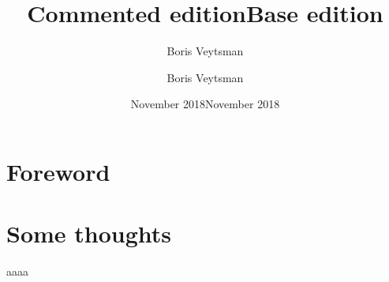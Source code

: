 \documentclass{book}
\title{Commented edition}
\author{Boris Veytsman}
\date{November 2018}
\begin{document}
\frontmatter
\title{Base edition}
\author{Boris Veytsman}
\date{November 2018}
\maketitle

\chapter{Foreword}
\label{chap:foreword}


\kant[1-5]

\begin{commeditText}
  \kant[11-17]
\end{commeditText}

\mainmatter

\chapter{Some thoughts}
\label{chap:thoughts}



\begin{commeditComments}
  \kant[6]
\end{commeditComments}

\kant[6]


\begin{commeditComments}
  \kant[2]
\end{commeditComments}

\kant[5-8]

\begin{commeditComments}
  aaaa
\end{commeditComments}
\begin{commeditComments}
  \kant[8-20]
\end{commeditComments}

\kant[9-20]
\end{document}
